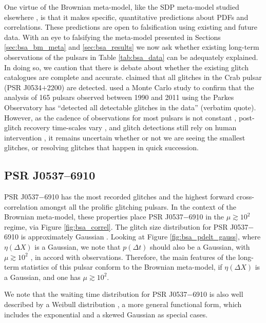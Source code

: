 One virtue of the Brownian meta-model, like the SDP meta-model studied elsewhere \citep{Fulgenzi2017, Melatos2018, Carlin2019quasi,Carlin2019ac}, is that it makes specific, quantitative predictions about PDFs and correlations. These predictions are open to falsification using existing and future data. With an eye to falsifying the meta-model presented in Sections \ref{sec:bsa_bm_meta} and \ref{sec:bsa_results} we now ask whether existing long-term observations of the pulsars in Table \ref{tab:bsa_data} can be adequately explained. In doing so, we caution that there is debate about whether the existing glitch catalogues are complete and accurate. \citet{Espinoza2014} claimed that all glitches in the Crab pulsar (PSR J0534$+$2200) are detected. \citet{Yu2017b} used a Monte Carlo study to confirm that the \citet{Yu2013} analysis of 165 pulsars observed between 1990 and 2011 using the Parkes Observatory has ``detected all detectable glitches in the data'' (verbatim quote). However, as the cadence of observations for most pulsars is not constant \citep{Janssen2006}, post-glitch recovery time-scales vary \citep{Alpar1984,VanEysden2010}, and glitch detections still rely on human intervention \citep{Yu2017b}, it remains uncertain whether or not we are seeing the smallest glitches, or resolving glitches that happen in quick succession.

\subsection{PSR J0537--6910}
PSR J0537$-$6910 has the most recorded glitches and the highest forward cross-correlation amongst all the prolific glitching pulsars. In the context of the Brownian meta-model, these properties place PSR J0537$-$6910 in the $\mu \gtrsim 10^2$ regime, via Figure \ref{fig:bsa_correl}. The glitch size distribution for PSR J0537$-$6910 is approximately Gaussian \citep{Fuentes2019}. Looking at Figure \ref{fig:bsa_pdelt_gauss}, where $\eta(\Delta X)$ is a Gaussian, we note that $p(\Delta t)$ should also be a Gaussian, with $\mu \gtrsim 10^2$ , in accord with observations. Therefore, the main features of the long-term statistics of this pulsar conform to the Brownian meta-model, if $\eta(\Delta X)$ is a Gaussian, and one has $\mu \gtrsim 10^2$.

We note that the waiting time distribution for PSR J0537$-$6910 is also well described by a Weibull distribution \citep{Antonopoulou2018}, a more general functional form, which includes the exponential and a skewed Gaussian as special cases. 

